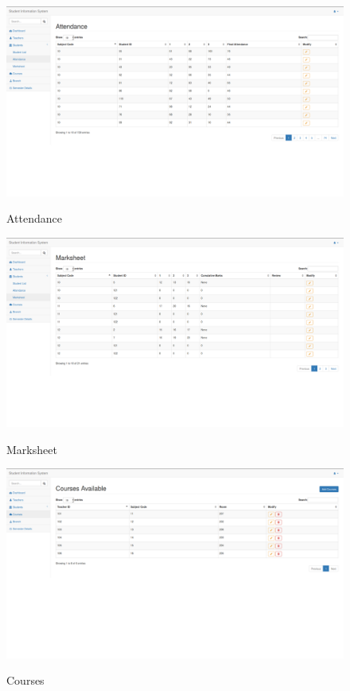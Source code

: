 \begin{figure}[H]
\centering
\caption{Attendance}
\includegraphics[width=\textwidth,height=\textheight,keepaspectratio]{./snaps/6.png}
\\[0.2in]
\label{fig:Attendance}
\end{figure}

\begin{figure}[H]
\centering
\caption{Marksheet}
\includegraphics[width=\textwidth,height=\textheight,keepaspectratio]{./snaps/7.png}
\\[0.2in]
\label{fig:Marksheet}
\end{figure}

\begin{figure}[H]
\centering
\caption{Courses}
\includegraphics[width=\textwidth,height=\textheight,keepaspectratio]{./snaps/8.png}
\\[0.2in]
\label{fig:Courses}
\end{figure}

